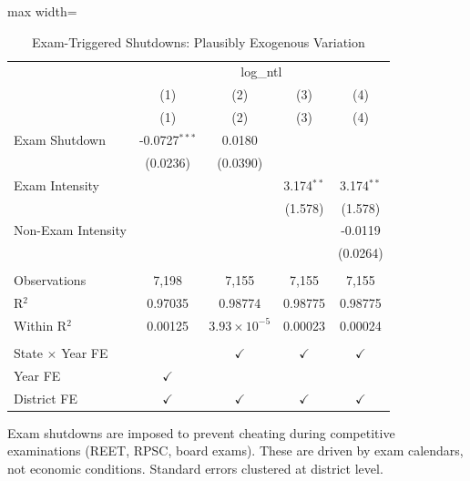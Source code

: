
\begin{table}[htbp]
   \caption{\label{tab:exam} Exam-Triggered Shutdowns: Plausibly Exogenous Variation}
   \bigskip
   \centering
   \begin{adjustbox}{max width=\textwidth}
\begin{tabular}{lcccc}
      \toprule
       & \multicolumn{4}{c}{log\_ntl}\\
                              & (1)             & (2)                   & (3)           & (4) \\   
                              & (1)             & (2)                   & (3)           & (4)\\  
      \midrule 
      Exam Shutdown           & -0.0727$^{***}$ & 0.0180                &               &   \\   
                              & (0.0236)        & (0.0390)              &               &   \\   
      Exam Intensity          &                 &                       & 3.174$^{**}$  & 3.174$^{**}$\\   
                              &                 &                       & (1.578)       & (1.578)\\   
      Non-Exam Intensity      &                 &                       &               & -0.0119\\   
                              &                 &                       &               & (0.0264)\\   
       \\
      Observations            & 7,198           & 7,155                 & 7,155         & 7,155\\  
      R$^2$                   & 0.97035         & 0.98774               & 0.98775       & 0.98775\\  
      Within R$^2$            & 0.00125         & $3.93\times 10^{-5}$  & 0.00023       & 0.00024\\  
       \\
      State $\times$ Year FE  &                 & $\checkmark$          & $\checkmark$  & $\checkmark$\\   
      Year FE                 & $\checkmark$    &                       &               & \\  
      District FE             & $\checkmark$    & $\checkmark$          & $\checkmark$  & $\checkmark$\\   
      \bottomrule
   \end{tabular}
\end{adjustbox}
   
   \par \raggedright 
   Exam shutdowns are imposed to prevent cheating during competitive examinations (REET, RPSC, board exams). These are driven by exam calendars, not economic conditions. Standard errors clustered at district level.
\end{table}


